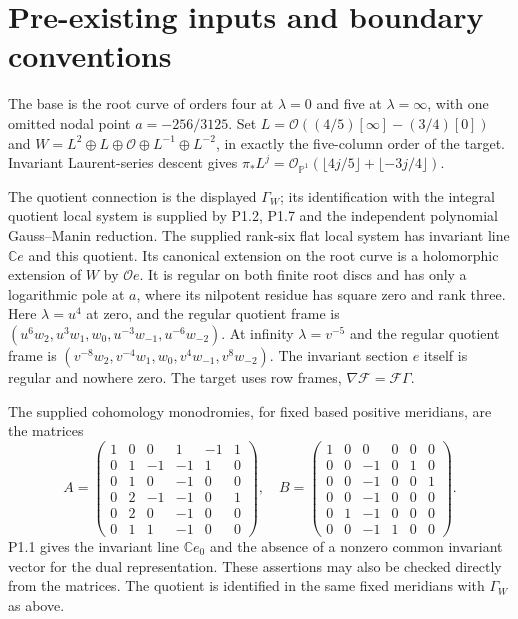 \section*{Pre-existing inputs and boundary conventions}

The base is the root curve of orders four at $\lambda=0$ and five at
$\lambda=\infty$, with one omitted nodal point
$a=-256/3125$. Set
$L=\mathcal O((4/5)[\infty]-(3/4)[0])$ and
$W=L^2\oplus L\oplus\mathcal O\oplus L^{-1}\oplus L^{-2}$,
in exactly the five-column order of the target.
Invariant Laurent-series descent gives
$\pi_*L^j=\mathcal O_{\mathbb P^1}(\lfloor4j/5\rfloor+
\lfloor-3j/4\rfloor)$.

The quotient connection is the displayed $\Gamma_W$; its identification with
the integral quotient local system is supplied by P1.2, P1.7 and the independent
polynomial Gauss--Manin reduction. The supplied rank-six flat local system
has invariant line $\mathbb C e$ and this quotient. Its canonical extension on
the root curve is a holomorphic extension of $W$ by $\mathcal O e$.
It is regular on both finite root discs and has only a logarithmic pole at $a$,
where its nilpotent residue has square zero and rank three.
Here $\lambda=u^4$ at zero, and the regular quotient frame is
$(u^6w_2,u^3w_1,w_0,u^{-3}w_{-1},u^{-6}w_{-2})$.
At infinity $\lambda=v^{-5}$ and the regular quotient frame is
$(v^{-8}w_2,v^{-4}w_1,w_0,v^4w_{-1},v^8w_{-2})$.
The invariant section $e$ itself is regular and nowhere zero.
The target uses row frames, $\nabla\mathcal F=\mathcal F\Gamma$.

The supplied cohomology monodromies, for fixed based positive meridians,
are the matrices
\[
A=\begin{pmatrix}
1&0&0&1&-1&1\\0&1&-1&-1&1&0\\0&1&0&-1&0&0\\
0&2&-1&-1&0&1\\0&2&0&-1&0&0\\0&1&1&-1&0&0
\end{pmatrix},\quad
B=\begin{pmatrix}
1&0&0&0&0&0\\0&0&-1&0&1&0\\0&0&-1&0&0&1\\
0&0&-1&0&0&0\\0&1&-1&0&0&0\\0&0&-1&1&0&0
\end{pmatrix}.
\]
P1.1 gives the invariant line $\mathbb C e_0$ and the absence of a
nonzero common invariant vector for the dual representation. These assertions
may also be checked directly from the matrices. The quotient is identified in
the same fixed meridians with $\Gamma_W$ as above.

